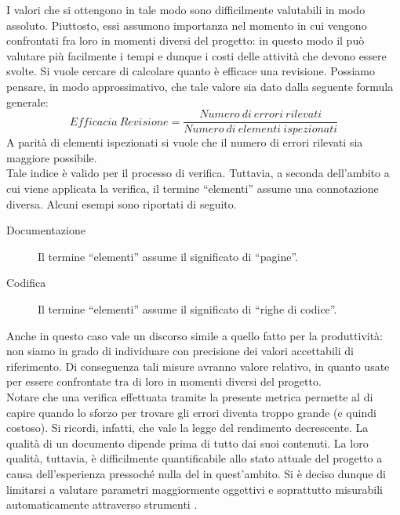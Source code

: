 					I valori che si ottengono in tale modo sono difficilmente valutabili in modo assoluto. Piuttosto, essi assumono importanza nel 
					momento in cui vengono confrontati fra loro in momenti diversi del progetto: in questo modo il  può valutare 
					più facilmente i tempi e dunque i costi delle attività che devono essere svolte.
					Si vuole cercare di calcolare quanto è efficace una revisione. Possiamo pensare, in modo approssimativo, che tale valore sia dato 
					dalla seguente formula generale:
					\begin{equation} \label{eq:efficaciarevisione}
						Efficacia\ Revisione = \frac{Numero\ di\ errori\ rilevati}{Numero\ di\ elementi\ ispezionati}
					\end{equation}
					A parità di elementi ispezionati si vuole che il numero di errori rilevati sia maggiore possibile.\\
					Tale indice è valido per il processo di verifica. Tuttavia, a seconda dell'ambito a cui viene applicata la verifica, il termine 
					“elementi” assume una connotazione diversa. Alcuni esempi sono riportati di seguito.
					\begin{description}
						\item[Documentazione] Il termine “elementi” assume il significato di “pagine”.
						\item[Codifica] Il termine “elementi” assume il significato di “righe di codice”.
					\end{description}
					Anche in questo caso vale un discorso simile a quello fatto per la produttività: non siamo in grado di individuare con 
					precisione dei valori accettabili di riferimento. Di conseguenza tali misure avranno valore relativo, in quanto usate per essere 
					confrontate tra di loro in momenti diversi del progetto.\\
					Notare che una verifica effettuata tramite la presente metrica permette al  di capire quando lo sforzo per 
					trovare gli errori diventa troppo grande (e quindi costoso). Si ricordi, infatti, che vale la legge del rendimento decrescente.
				La qualità di un documento dipende prima di tutto dai suoi contenuti. La loro qualità, tuttavia, è difficilmente quantificabile allo 
				stato attuale del progetto a causa dell'esperienza pressoché nulla del  in quest'ambito. Si è deciso dunque di limitarsi a valutare 
				parametri maggiormente oggettivi e soprattutto misurabili automaticamente attraverso strumenti .
